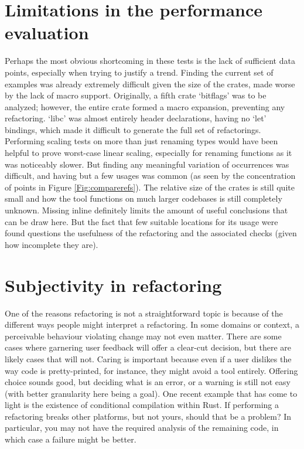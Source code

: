 \section{Limitations in the performance evaluation}
Perhaps the most obvious shortcoming in these tests is the lack of sufficient data points, especially when trying to justify a trend. Finding the current set of examples was already extremely difficult given the size of the crates, made worse by the lack of macro support. Originally, a fifth crate `bitflags' was to be analyzed; however, the entire crate formed a macro expansion, preventing any refactoring. `libc' was almost entirely header declarations, having no `let' bindings, which made it difficult to generate the full set of refactorings. Performing scaling tests on more than just renaming types would have been helpful to prove worst-case linear scaling, especially for renaming functions as it was noticeably slower. But finding any meaningful variation of occurrences was difficult, and having but a few usages was common (as seen by the concentration of points in Figure \ref{Fig:comparerefs}). The relative size of the crates is still quite small and how the tool functions on much larger codebases is still completely unknown. Missing inline definitely limits the amount of useful conclusions that can be draw here. But the fact that few suitable locations for its usage were found questions the usefulness of the refactoring and the associated checks (given how incomplete they are). 

\section{Subjectivity in refactoring}
One of the reasons refactoring is not a straightforward topic is because of the different ways people might interpret a refactoring. In some domains or context, a perceivable behaviour violating change may not even matter. There are some cases where garnering user feedback will offer a clear-cut decision, but there are likely cases that will not. Caring is important because even if a user dislikes the way code is pretty-printed, for instance, they might avoid a tool entirely. Offering choice sounds good, but deciding what is an error, or a warning is still not easy (with better granularity here being a goal). One recent example that has come to light is the existence of conditional compilation within Rust. If performing a refactoring breaks other platforms, but not yours, should that be a problem? In particular, you may not have the required analysis of the remaining code, in which case a failure might be better.

